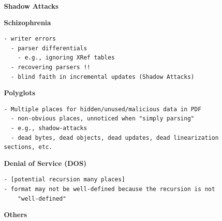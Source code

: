 {\bf{Shadow Attacks}} 

{\bf{Schizophrenia}} 
\begin{lstlisting}[style=meta]
  - writer errors
  - parser differentials
    - e.g., ignoring XRef tables
  - recovering parsers !!
  - blind faith in incremental updates (Shadow Attacks)
\end{lstlisting}

{\bf{Polyglots}} 
\begin{lstlisting}[style=meta]
- Multiple places for hidden/unused/malicious data in PDF
  - non-obvious places, unnoticed when "simply parsing"
  - e.g., shadow-attacks
  - dead bytes, dead objects, dead updates, dead linearization sections, etc.
\end{lstlisting}

{\bf{Denial of Service (DOS)}} 
%
\begin{lstlisting}[style=meta]
- [potential recursion many places]
- format may not be well-defined because the recursion is not
    "well-defined"
\end{lstlisting}



{\bf{Others}} 

